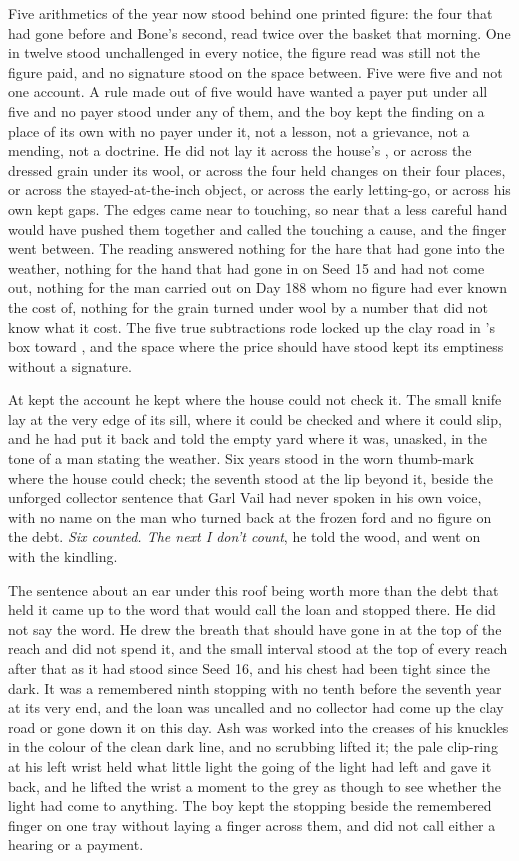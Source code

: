 Five arithmetics of the year now stood behind one printed figure: the four that had gone before and Bone's second, read twice over the basket that morning. One in twelve stood unchallenged in every notice, the figure read was still not the figure paid, and no signature stood on the space between. Five were five and not one account. A rule made out of five would have wanted a payer put under all five and no payer stood under any of them, and the boy kept the finding on a place of its own with no payer under it, not a lesson, not a grievance, not a mending, not a doctrine. He did not lay it across the house's , or across the dressed grain under its wool, or across the four held changes on their four places, or across the stayed-at-the-inch object, or across the early letting-go, or across his own kept gaps. The edges came near to touching, so near that a less careful hand would have pushed them together and called the touching a cause, and the finger went between. The reading answered nothing for the hare that had gone into the weather, nothing for the hand that had gone in on Seed 15 and had not come out, nothing for the man carried out on Day 188 whom no figure had ever known the cost of, nothing for the grain turned under wool by a number that did not know what it cost. The five true subtractions rode locked up the clay road in 's box toward , and the space where the price should have stood kept its emptiness without a signature.

At   kept the account he kept where the house could not check it. The small knife lay at the very edge of its sill, where it could be checked and where it could slip, and he had put it back and told the empty yard where it was, unasked, in the tone of a man stating the weather. Six years stood in the worn thumb-mark where the house could check; the seventh stood at the lip beyond it, beside the unforged collector sentence that Garl Vail had never spoken in his own voice, with no name on the man who turned back at the frozen ford and no figure on the debt. \emph{Six counted. The next I don't count}, he told the wood, and went on with the kindling.

The sentence about an ear under this roof being worth more than the debt that held it came up to the word that would call the loan and stopped there. He did not say the word. He drew the breath that should have gone in at the top of the reach and did not spend it, and the small interval stood at the top of every reach after that as it had stood since Seed 16, and his chest had been tight since the dark. It was a remembered ninth stopping with no tenth before the seventh year at its very end, and the loan was uncalled and no collector had come up the clay road or gone down it on this day. Ash was worked into the creases of his knuckles in the colour of the clean dark line, and no scrubbing lifted it; the pale clip-ring at his left wrist held what little light the going of the light had left and gave it back, and he lifted the wrist a moment to the grey as though to see whether the light had come to anything. The boy kept the stopping beside the remembered finger on one tray without laying a finger across them, and did not call either a hearing or a payment.

